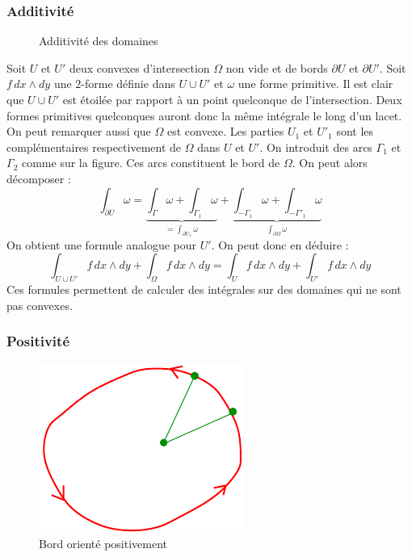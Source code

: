 \subsubsection{Additivité}
\begin{figure}
 \centering
 
 \caption{Additivité des domaines}
 \label{fig:C2269_9}
\end{figure}
Soit $U$ et $U'$ deux convexes d'intersection $\Omega$ non vide et de bords $\partial U$ et $\partial U'$. Soit $f\,dx\wedge dy$ une 2-forme définie dans $U\cup U'$ et $\omega$ une forme primitive. Il est clair que $U\cup U'$ est étoilée par rapport à un point quelconque de l'intersection. Deux formes primitives quelconques auront donc la même intégrale le long d'un lacet. On peut remarquer aussi que $\Omega$ est convexe.\newline
 Les parties $U_1$ et $U'_1$ sont les complémentaires respectivement de $\Omega$ dans $U$ et $U'$. On introduit des arcs $\Gamma_1$ et $\Gamma_2$ comme sur la figure. Ces arcs constituent le bord de $\Omega$. On peut alors décomposer :
\begin{displaymath}
 \int_{\partial U}\omega = 
\underset{=\int_{\partial U_1}\omega}{\underbrace{\int_{\Gamma}\omega + \int_{\Gamma_1}\omega}} +
\underset{\int_{\partial \Omega}\omega}{\underbrace{\int_{ -\Gamma_1}\omega + \int_{- \Gamma'_1}\omega}}
\end{displaymath}
On obtient une formule analogue pour $U'$. On peut donc en déduire :
\begin{displaymath}
 \int_{U\cup U'}f\,dx\wedge dy + \int_{\Omega}f\,dx\wedge dy = \int_{U}f\,dx\wedge dy + \int_{U'}f\,dx\wedge dy
\end{displaymath}
Ces formules permettent de calculer des intégrales sur des domaines qui ne sont pas convexes.

\subsubsection{Positivité}
\begin{figure}
\includegraphics{C2269_10.pdf}
 \caption{Bord orienté positivement}
 \label{fig:C2269_10}
\end{figure}

